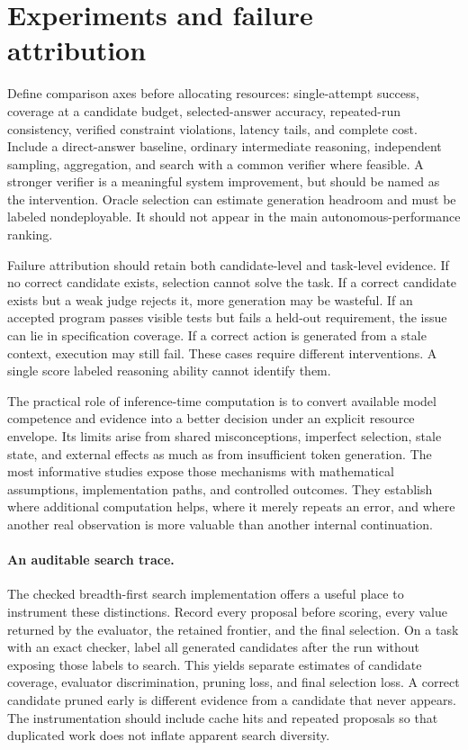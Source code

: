 \section{Experiments and failure attribution}
\label{sec:C09:experiments}
Define comparison axes before allocating resources: single-attempt success, coverage at a candidate budget, selected-answer accuracy, repeated-run consistency, verified constraint violations, latency tails, and complete cost. Include a direct-answer baseline, ordinary intermediate reasoning, independent sampling, aggregation, and search with a common verifier where feasible. A stronger verifier is a meaningful system improvement, but should be named as the intervention. Oracle selection can estimate generation headroom and must be labeled nondeployable. It should not appear in the main autonomous-performance ranking.



Failure attribution should retain both candidate-level and task-level evidence. If no correct candidate exists, selection cannot solve the task. If a correct candidate exists but a weak judge rejects it, more generation may be wasteful. If an accepted program passes visible tests but fails a held-out requirement, the issue can lie in specification coverage. If a correct action is generated from a stale context, execution may still fail. These cases require different interventions. A single score labeled reasoning ability cannot identify them.

The practical role of inference-time computation is to convert available model competence and evidence into a better decision under an explicit resource envelope. Its limits arise from shared misconceptions, imperfect selection, stale state, and external effects as much as from insufficient token generation. The most informative studies expose those mechanisms with mathematical assumptions, implementation paths, and controlled outcomes. They establish where additional computation helps, where it merely repeats an error, and where another real observation is more valuable than another internal continuation.

\paragraph{An auditable search trace.}
The checked breadth-first search implementation offers a useful place to instrument these distinctions. Record every proposal before scoring, every value returned by the evaluator, the retained frontier, and the final selection. On a task with an exact checker, label all generated candidates after the run without exposing those labels to search. This yields separate estimates of candidate coverage, evaluator discrimination, pruning loss, and final selection loss. A correct candidate pruned early is different evidence from a candidate that never appears. The instrumentation should include cache hits and repeated proposals so that duplicated work does not inflate apparent search diversity.

